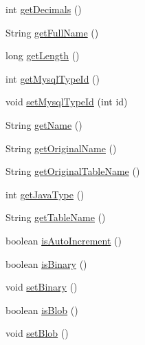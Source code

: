 \begin{DoxyCompactItemize}
\item 
int \mbox{\hyperlink{classcom_1_1mysql_1_1cj_1_1result_1_1_field_ac7eb55fc0db8deacfd5ad1c0e1918049}{get\+Decimals}} ()
\item 
String \mbox{\hyperlink{classcom_1_1mysql_1_1cj_1_1result_1_1_field_a34c91df8954bf965d2ed40c4ecf99bf6}{get\+Full\+Name}} ()
\item 
long \mbox{\hyperlink{classcom_1_1mysql_1_1cj_1_1result_1_1_field_a21afd98425e8df139e646816efc4f9db}{get\+Length}} ()
\item 
int \mbox{\hyperlink{classcom_1_1mysql_1_1cj_1_1result_1_1_field_a7f9eaa3c653efe793bde46a95baa8f77}{get\+Mysql\+Type\+Id}} ()
\item 
void \mbox{\hyperlink{classcom_1_1mysql_1_1cj_1_1result_1_1_field_afda3ae13d094f24bf0f63f0e43e8b8b8}{set\+Mysql\+Type\+Id}} (int id)
\item 
String \mbox{\hyperlink{classcom_1_1mysql_1_1cj_1_1result_1_1_field_a86b8e06e7c51c9e67249c662707ffd2b}{get\+Name}} ()
\item 
String \mbox{\hyperlink{classcom_1_1mysql_1_1cj_1_1result_1_1_field_a84ed352a165d954c47c07b8cb1515818}{get\+Original\+Name}} ()
\item 
String \mbox{\hyperlink{classcom_1_1mysql_1_1cj_1_1result_1_1_field_a3274416d43e96ea6eaa07f8534dfee2f}{get\+Original\+Table\+Name}} ()
\item 
int \mbox{\hyperlink{classcom_1_1mysql_1_1cj_1_1result_1_1_field_acc2e0ea73b00d0e203d5578cb663a74c}{get\+Java\+Type}} ()
\item 
String \mbox{\hyperlink{classcom_1_1mysql_1_1cj_1_1result_1_1_field_ad5ed45bf1554bdc2451d7166093b1841}{get\+Table\+Name}} ()
\item 
boolean \mbox{\hyperlink{classcom_1_1mysql_1_1cj_1_1result_1_1_field_aee93b033a8bd7854b8b7bb336425282f}{is\+Auto\+Increment}} ()
\item 
boolean \mbox{\hyperlink{classcom_1_1mysql_1_1cj_1_1result_1_1_field_aaee77a49e345508d47b8ae2a3193d3f4}{is\+Binary}} ()
\item 
void \mbox{\hyperlink{classcom_1_1mysql_1_1cj_1_1result_1_1_field_a80f2828ba4d47c40cd3df78a694adb34}{set\+Binary}} ()
\item 
boolean \mbox{\hyperlink{classcom_1_1mysql_1_1cj_1_1result_1_1_field_abf9b0ac59c1ce77a2f74892be425a35e}{is\+Blob}} ()
\item 
void \mbox{\hyperlink{classcom_1_1mysql_1_1cj_1_1result_1_1_field_a2cb145ab8783b15e3b09b8daa6ff5d29}{set\+Blob}} ()
\item 

\end{DoxyCompactItemize}
